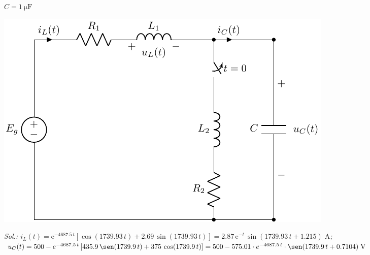 \begin{enumerate}
\begin{minipage}{0.3\linewidth}
  $C = \SI{1}{\micro\farad}$%
\end{minipage}
\begin{minipage}{0.7\linewidth}
  \includegraphics{../figs/E1_RLC.pdf}
\end{minipage}

\emph{Sol.:\;\;
  $i_L(t)=
  \mathrm{e}^{-4687.5\,t}\left[\cos(1739.93\,t)+2.69\,\sin(1739.93\,t)\right]=2.87\,\mathrm{e}^{-t}\,\sin\left(1739.93\,t+1.215\right)\;\unit{\ampere}$;\;\;
  $u_C(t) = 500 - e^{-4687.5 \,t} \left[435.9\, \sen(1739.9 \,t) + 375\, \cos(1739.9 \,t)\right] = 500 - 575.01 \cdot e^{-4687.5 \,t} \cdot  \sen(1739.9 \,t + 0.7104)\;\unit{\volt}$
  }

\end{enumerate}
